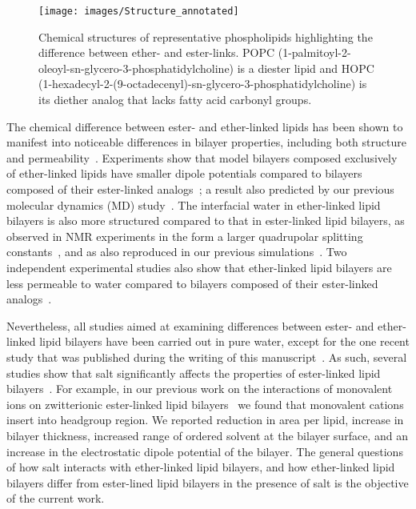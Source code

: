 \documentclass[12pt,preprint,times,openany,draft]{book}
\begin{document}
\begin{figure}
\caption[Chemical structures of representative phospholipids  the difference
between ether- and ester-links. POPC
 is a diester lipid and HOPC
 is its diether analog that lacks fatty acid carbonyl groups.]{ 
Chemical structures of representative phospholipids highlighting the difference 
between ether- and ester-links. POPC (1-palmitoyl-2-oleoyl-sn-glycero-3-phosphatidylcholine) is a diester lipid and HOPC (1-hexadecyl-2-(9-octadecenyl)-sn-glycero-3-phosphatidylcholine) is its diether analog that lacks fatty acid carbonyl groups.
}
\label{fig:struc}
\texttt{[image: images/Structure\_annotated]}
\end{figure}

The chemical difference between ester- and ether-linked lipids has been shown to manifest into noticeable 
differences in bilayer properties, including both structure and permeability~\cite{guler:2009,jansen:1995, gawrisch:1992,haas:1990,fogarty:2015,kruczek:2017:ether}. 
Experiments show that model bilayers composed exclusively of ether-linked lipids have smaller dipole potentials compared to 
bilayers composed of their ester-linked analogs~\cite{gawrisch:1992}; a result also predicted by our previous molecular dynamics (MD) 
study~\cite{kruczek:2017:ether}. The interfacial water in ether-linked lipid bilayers is also more structured compared to that 
in ester-linked lipid bilayers, as observed in NMR experiments in the form a larger quadrupolar splitting constants~\cite{gawrisch:1992}, and as 
also reproduced in our previous simulations~\cite{kruczek:2017:ether}. Two independent experimental studies also show 
that ether-linked lipid bilayers are less permeable to water compared to bilayers composed of their ester-linked 
analogs~\cite{jansen:1995, guler:2009}. 

Nevertheless, all studies aimed at examining differences between ester- and ether-linked lipid bilayers have been carried out in pure water, except for the one recent study 
that was published during the writing of this manuscript~\cite{leonard:2018}. As such, several studies show that salt significantly 
affects the properties of ester-linked lipid bilayers~\cite{kruczek:2017, duro:2016,pabst:2007,sachs:2004,petrache:2006:swelling}. 
For example, in our previous work on the interactions of monovalent ions on zwitterionic ester-linked lipid bilayers~\cite{kruczek:2017}
we found that monovalent cations insert into headgroup region. 
We reported reduction in area per lipid, increase in  bilayer thickness, increased range of ordered solvent at the bilayer surface, and an increase in
the electrostatic dipole potential of the bilayer.
The general questions of how salt interacts 
with ether-linked lipid bilayers, and how ether-linked lipid bilayers differ from ester-lined lipid bilayers in the presence of salt is the
objective of the current work.
\end{document}
